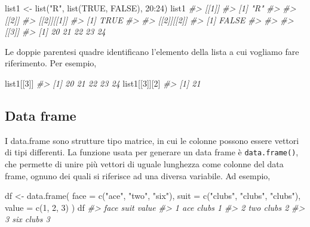 \documentclass[
]{memoir}
\newenvironment{Shaded}{\begin{snugshade}}{\end{snugshade}}
\newcommand{\AttributeTok}[1]{\textcolor[rgb]{0.77,0.63,0.00}{#1}}
\newcommand{\CommentTok}[1]{\textcolor[rgb]{0.56,0.35,0.01}{\textit{#1}}}
\newcommand{\ConstantTok}[1]{\textcolor[rgb]{0.00,0.00,0.00}{#1}}
\newcommand{\DecValTok}[1]{\textcolor[rgb]{0.00,0.00,0.81}{#1}}
\newcommand{\FunctionTok}[1]{\textcolor[rgb]{0.00,0.00,0.00}{#1}}
\newcommand{\NormalTok}[1]{#1}
\newcommand{\OtherTok}[1]{\textcolor[rgb]{0.56,0.35,0.01}{#1}}
\newcommand{\SpecialCharTok}[1]{\textcolor[rgb]{0.00,0.00,0.00}{#1}}
\newcommand{\StringTok}[1]{\textcolor[rgb]{0.31,0.60,0.02}{#1}}
\theoremstyle{definition}
\theoremstyle{definition}
\theoremstyle{definition}
\theoremstyle{definition}
\theoremstyle{remark}
\begin{document}
\begin{Shaded}
\begin{Highlighting}[]
\NormalTok{list1 }\OtherTok{\textless{}{-}} \FunctionTok{list}\NormalTok{(}\StringTok{"R"}\NormalTok{, }\FunctionTok{list}\NormalTok{(}\ConstantTok{TRUE}\NormalTok{, }\ConstantTok{FALSE}\NormalTok{), }\DecValTok{20}\SpecialCharTok{:}\DecValTok{24}\NormalTok{)}
\NormalTok{list1}
\CommentTok{\#\textgreater{} [[1]]}
\CommentTok{\#\textgreater{} [1] "R"}
\CommentTok{\#\textgreater{} }
\CommentTok{\#\textgreater{} [[2]]}
\CommentTok{\#\textgreater{} [[2]][[1]]}
\CommentTok{\#\textgreater{} [1] TRUE}
\CommentTok{\#\textgreater{} }
\CommentTok{\#\textgreater{} [[2]][[2]]}
\CommentTok{\#\textgreater{} [1] FALSE}
\CommentTok{\#\textgreater{} }
\CommentTok{\#\textgreater{} }
\CommentTok{\#\textgreater{} [[3]]}
\CommentTok{\#\textgreater{} [1] 20 21 22 23 24}
\end{Highlighting}
\end{Shaded}

Le doppie parentesi quadre identificano l'elemento della lista a cui
vogliamo fare riferimento. Per esempio,

\begin{Shaded}
\begin{Highlighting}[]
\NormalTok{list1[[}\DecValTok{3}\NormalTok{]]}
\CommentTok{\#\textgreater{} [1] 20 21 22 23 24}
\NormalTok{list1[[}\DecValTok{3}\NormalTok{]][}\DecValTok{2}\NormalTok{]}
\CommentTok{\#\textgreater{} [1] 21}
\end{Highlighting}
\end{Shaded}

\hypertarget{data-frame}{%
\subsection{Data frame}\label{data-frame}}

I data.frame sono strutture tipo matrice, in cui le colonne possono
essere vettori di tipi differenti. La funzione usata per generare un
data frame è \texttt{data.frame()}, che permette di unire più vettori di uguale
lunghezza come colonne del data frame, ognuno dei quali si riferisce ad
una diversa variabile. Ad esempio,

\begin{Shaded}
\begin{Highlighting}[]
\NormalTok{df }\OtherTok{\textless{}{-}} \FunctionTok{data.frame}\NormalTok{(}
  \AttributeTok{face =} \FunctionTok{c}\NormalTok{(}\StringTok{"ace"}\NormalTok{, }\StringTok{"two"}\NormalTok{, }\StringTok{"six"}\NormalTok{),}
  \AttributeTok{suit =} \FunctionTok{c}\NormalTok{(}\StringTok{"clubs"}\NormalTok{, }\StringTok{"clubs"}\NormalTok{, }\StringTok{"clubs"}\NormalTok{),}
  \AttributeTok{value =} \FunctionTok{c}\NormalTok{(}\DecValTok{1}\NormalTok{, }\DecValTok{2}\NormalTok{, }\DecValTok{3}\NormalTok{)}
\NormalTok{)}
\NormalTok{df}
\CommentTok{\#\textgreater{}   face  suit value}
\CommentTok{\#\textgreater{} 1  ace clubs     1}
\CommentTok{\#\textgreater{} 2  two clubs     2}
\CommentTok{\#\textgreater{} 3  six clubs     3}
\end{Highlighting}
\end{Shaded}
\end{document}
